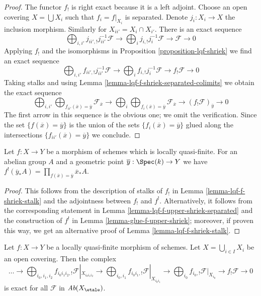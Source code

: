 \begin{proof}
The functor $f_!$ is right exact because it is a left adjoint.
Choose an open covering $X = \bigcup X_i$ such that $f_i = f|_{X_i}$
is separated. Denote $j_i : X_i \to X$ the inclusion morphism.
Similarly for $X_{ii'} = X_i \cap X_{i'}$.
There is an exact sequence
$$
\bigoplus\nolimits_{i, i'} j_{ii', !} j_{ii'}^{-1}\mathcal{F} \to
\bigoplus\nolimits_i j_{i, !} j_i^{-1}\mathcal{F}
\to \mathcal{F} \to 0
$$
Applying $f_!$ and the isomorphisms in Proposition \ref{proposition-lqf-shriek}
we find an exact sequence
$$
\bigoplus\nolimits_{i, i'} f_{ii', !} j_{ii'}^{-1}\mathcal{F} \to
\bigoplus\nolimits_i f_{i, !} j_i^{-1}\mathcal{F}
\to f_!\mathcal{F} \to 0
$$
Taking stalks and using Lemma \ref{lemma-lqf-f-shriek-separated-colimits}
we obtain the exact sequence
$$
\bigoplus\nolimits_{i, i'}
\bigoplus\nolimits_{f_{ii'}(\overline{x}) = \overline{y}}
\mathcal{F}_{\overline{x}}
\to
\bigoplus\nolimits_i
\bigoplus\nolimits_{f_i(\overline{x}) = \overline{y}}
\mathcal{F}_{\overline{x}}
\to
(f_!\mathcal{F})_{\overline{y}} \to 0
$$
The first arrow in this sequence is the obvious one; we omit the
verification. Since the set $\{f(\overline{x}) = \overline{y}\}$
is the union of the sets $\{f_i(\overline{x}) = \overline{y}\}$
glued along the intersections $\{f_{ii'}(\overline{x}) = \overline{y}\}$
we conclude.
\end{proof}

\begin{lemma}
\label{lemma-lqf-f-upper-shriek-stalk}
Let $f : X \to Y$ be a morphism of schemes which is locally quasi-finite.
For an abelian group $A$ and a geometric point
$\overline{y} : \Spec(k) \to Y$ we have
$f^!(\overline{y}_*A) = \prod\nolimits_{f(\overline{x}) = \overline{y}}
\overline{x}_*A$.
\end{lemma}

\begin{proof}
This follows from the description of stalks of $f_!$ in
Lemma \ref{lemma-lqf-f-shriek-stalk}
and the adjointness between $f_!$ and $f^!$.
Alternatively, it follows from the corresponding statement in
Lemma \ref{lemma-lqf-f-upper-shriek-separated}
and the construction of $f^!$ in
Lemma \ref{lemma-glue-f-upper-shriek}; moreover, if proven
this way, we get an alternative proof of Lemma \ref{lemma-lqf-f-shriek-stalk}.
\end{proof}

\begin{lemma}
\label{lemma-lqf-colimit-f-shriek}
Let $f : X \to Y$ be a locally quasi-finite morphism of schemes.
Let $X = \bigcup_{i \in I} X_i$ be an open covering. Then the complex
$$
\ldots \to
\bigoplus\nolimits_{i_0, i_1, i_2} f_{i_0i_1i_2, !}
\mathcal{F}|_{X_{i_0i_1i_2}} \to
\bigoplus\nolimits_{i_0, i_1} f_{i_0i_1, !} \mathcal{F}|_{X_{i_0i_1}} \to
\bigoplus\nolimits_{i_0} f_{i_0, !} \mathcal{F}|_{X_{i_0}}
\to f_!\mathcal{F} \to 0
$$
is exact for all $\mathcal{F}$ in $\textit{Ab}(X_\etale)$.
\end{lemma}

